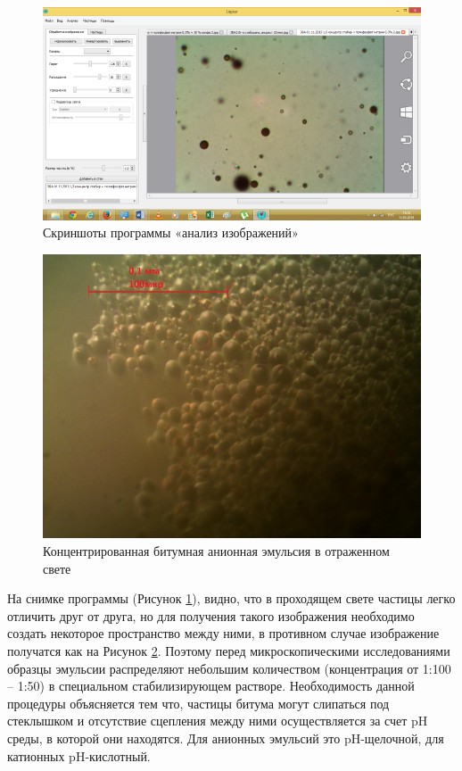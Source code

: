\begin{figure}[h]
	\centering
	\includegraphics{images/em_03}
	\caption{Скриншоты программы «анализ изображений»}
	\label{em_img_program}
\end{figure}

\begin{figure}[h]
	\centering
	\includegraphics{images/em_01}
	\caption{Концентрированная битумная анионная эмульсия в отраженном свете}
	\label{em_img_bad}
\end{figure}

На снимке программы (Рисунок \ref{em_img_program}), видно, что в проходящем свете частицы легко отличить друг от друга, но для получения такого изображения необходимо создать некоторое пространство между ними, в противном случае изображение получатся как на Рисунок \ref{em_img_bad}. Поэтому перед микроскопическими исследованиями образцы эмульсии распределяют небольшим количеством (концентрация от 1:100 – 1:50) в специальном стабилизирующем растворе. Необходимость данной процедуры объясняется тем что, частицы битума могут слипаться под стеклышком и отсутствие сцепления между ними осуществляется за счет pH среды, в которой они находятся. Для анионных эмульсий это pH-щелочной, для катионных pH-кислотный.

